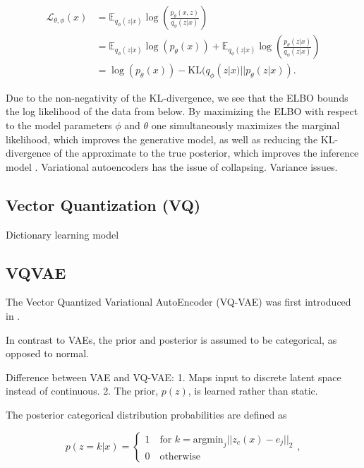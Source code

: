 \documentclass[../../thesis.tex]{subfiles}
\begin{document}
\begin{equation}
    \begin{aligned}
        \label{eq:ELBO}
        \mathcal{L}_{\theta,\phi}(x) 
        &= \mathbb{E}_{q_\phi(z|x)} \log \left( \frac{p_\theta(x,z)}{q_\phi(z|x)}\right) \\ 
        &=  \mathbb{E}_{q_\phi(z|x)} \log \left( p_\theta(x)\right) + \mathbb{E}_{q_\phi(z|x)} \log \left( \frac{p_\theta(z|x)}{q_\phi(z|x)}\right) \\
        &= \log \left( p_\theta(x)\right) - \textrm{KL}(q_\phi(z|x)|| p_\theta(z|x)).
    \end{aligned}
\end{equation}

Due to the non-negativity of the KL-divergence, we see that the ELBO bounds the log likelihood of the data from below. By maximizing the ELBO with respect to the model parameters $\phi$ and $\theta$ one simultaneously maximizes the marginal likelihood, which improves the generative model, as well as reducing the KL-divergence of the approximate to the true posterior, which improves the inference model \cite{VAE}.\newline
{}
Variational autoencoders has the issue of collapsing. Variance issues.



\subsection{Vector Quantization (VQ)}
Dictionary learning model \cite{Gray1984VQ}

\subsection{VQVAE}
The Vector Quantized Variational AutoEncoder (VQ-VAE) was first introduced in \cite{VQVAE}. 

In contrast to VAEs, the prior and posterior is assumed to be categorical, as opposed to normal. 

Difference between VAE and VQ-VAE: 1. Maps input to discrete latent space instead of continuous. 2. The prior, $p(z)$, is learned rather than static.

The posterior categorical distribution probabilities are defined as

\begin{equation}
    p(z=k | x) = 
    \begin{cases} 
        1 \quad \text{for }k = \textrm{argmin}_j||z_e(x) - e_j||_2 \\
        0 \quad \text{otherwise}
    \end{cases},
\end{equation}
\end{document}

